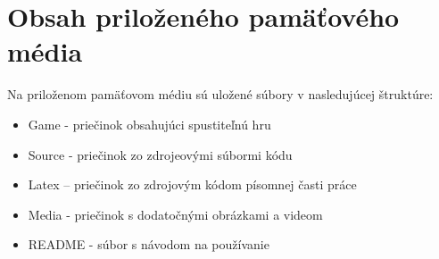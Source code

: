 \chapter{Obsah priloženého pamäťového média}

Na priloženom pamäťovom médiu sú uložené súbory v nasledujúcej štruktúre:

\begin{itemize}
    \item Game      - priečinok obsahujúci spustiteľnú hru
    \item Source    - priečinok zo zdrojeovými súbormi kódu
    \item Latex     – priečinok zo zdrojovým kódom písomnej časti práce
    \item Media     - priečinok s dodatočnými obrázkami a videom
    \item README    - súbor s návodom na používanie
\end{itemize}
